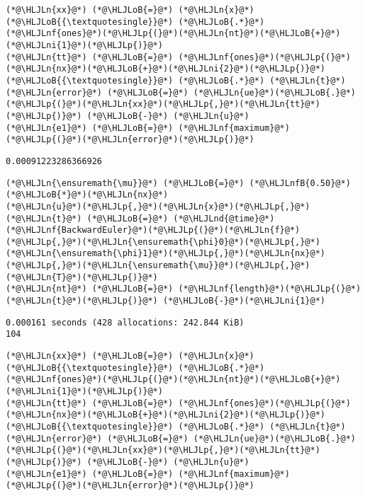 \documentclass[12pt,landscape]{article}
\newcommand{\HLJLn}[1]{#1}
\newcommand{\HLJLnd}[1]{\textcolor[RGB]{214,102,97}{#1}}
\newcommand{\HLJLnf}[1]{\textcolor[RGB]{66,102,213}{#1}}
\newcommand{\HLJLnfB}[1]{\textcolor[RGB]{59,151,46}{#1}}
\newcommand{\HLJLni}[1]{\textcolor[RGB]{59,151,46}{#1}}
\newcommand{\HLJLoB}[1]{\textcolor[RGB]{102,102,102}{\textbf{#1}}}
\newcommand{\HLJLp}[1]{#1}
\begin{document}
{\begin{lstlisting}
(*@\HLJLn{xx}@*) (*@\HLJLoB{=}@*) (*@\HLJLn{x}@*)(*@\HLJLoB{{\textquotesingle}}@*) (*@\HLJLoB{.*}@*) (*@\HLJLnf{ones}@*)(*@\HLJLp{(}@*)(*@\HLJLn{nt}@*)(*@\HLJLoB{+}@*)(*@\HLJLni{1}@*)(*@\HLJLp{)}@*)
(*@\HLJLn{tt}@*) (*@\HLJLoB{=}@*) (*@\HLJLnf{ones}@*)(*@\HLJLp{(}@*)(*@\HLJLn{nx}@*)(*@\HLJLoB{+}@*)(*@\HLJLni{2}@*)(*@\HLJLp{)}@*)(*@\HLJLoB{{\textquotesingle}}@*) (*@\HLJLoB{.*}@*) (*@\HLJLn{t}@*)
(*@\HLJLn{error}@*) (*@\HLJLoB{=}@*) (*@\HLJLn{ue}@*)(*@\HLJLoB{.}@*)(*@\HLJLp{(}@*)(*@\HLJLn{xx}@*)(*@\HLJLp{,}@*)(*@\HLJLn{tt}@*)(*@\HLJLp{)}@*) (*@\HLJLoB{-}@*) (*@\HLJLn{u}@*) 
(*@\HLJLn{e1}@*) (*@\HLJLoB{=}@*) (*@\HLJLnf{maximum}@*)(*@\HLJLp{(}@*)(*@\HLJLn{error}@*)(*@\HLJLp{)}@*)
\end{lstlisting}

\begin{lstlisting}
0.00091223286366926
\end{lstlisting}


\begin{lstlisting}
(*@\HLJLn{\ensuremath{\mu}}@*) (*@\HLJLoB{=}@*) (*@\HLJLnfB{0.50}@*)(*@\HLJLoB{*}@*)(*@\HLJLn{nx}@*)
(*@\HLJLn{u}@*)(*@\HLJLp{,}@*)(*@\HLJLn{x}@*)(*@\HLJLp{,}@*)(*@\HLJLn{t}@*) (*@\HLJLoB{=}@*) (*@\HLJLnd{@time}@*) (*@\HLJLnf{BackwardEuler}@*)(*@\HLJLp{(}@*)(*@\HLJLn{f}@*)(*@\HLJLp{,}@*)(*@\HLJLn{\ensuremath{\phi}0}@*)(*@\HLJLp{,}@*)(*@\HLJLn{\ensuremath{\phi}1}@*)(*@\HLJLp{,}@*)(*@\HLJLn{nx}@*)(*@\HLJLp{,}@*)(*@\HLJLn{\ensuremath{\mu}}@*)(*@\HLJLp{,}@*)(*@\HLJLn{T}@*)(*@\HLJLp{)}@*)
(*@\HLJLn{nt}@*) (*@\HLJLoB{=}@*) (*@\HLJLnf{length}@*)(*@\HLJLp{(}@*)(*@\HLJLn{t}@*)(*@\HLJLp{)}@*) (*@\HLJLoB{-}@*)(*@\HLJLni{1}@*)
\end{lstlisting}

\begin{lstlisting}
0.000161 seconds (428 allocations: 242.844 KiB)
104
\end{lstlisting}


\begin{lstlisting}
(*@\HLJLn{xx}@*) (*@\HLJLoB{=}@*) (*@\HLJLn{x}@*)(*@\HLJLoB{{\textquotesingle}}@*) (*@\HLJLoB{.*}@*) (*@\HLJLnf{ones}@*)(*@\HLJLp{(}@*)(*@\HLJLn{nt}@*)(*@\HLJLoB{+}@*)(*@\HLJLni{1}@*)(*@\HLJLp{)}@*)
(*@\HLJLn{tt}@*) (*@\HLJLoB{=}@*) (*@\HLJLnf{ones}@*)(*@\HLJLp{(}@*)(*@\HLJLn{nx}@*)(*@\HLJLoB{+}@*)(*@\HLJLni{2}@*)(*@\HLJLp{)}@*)(*@\HLJLoB{{\textquotesingle}}@*) (*@\HLJLoB{.*}@*) (*@\HLJLn{t}@*)
(*@\HLJLn{error}@*) (*@\HLJLoB{=}@*) (*@\HLJLn{ue}@*)(*@\HLJLoB{.}@*)(*@\HLJLp{(}@*)(*@\HLJLn{xx}@*)(*@\HLJLp{,}@*)(*@\HLJLn{tt}@*)(*@\HLJLp{)}@*) (*@\HLJLoB{-}@*) (*@\HLJLn{u}@*) 
(*@\HLJLn{e1}@*) (*@\HLJLoB{=}@*) (*@\HLJLnf{maximum}@*)(*@\HLJLp{(}@*)(*@\HLJLn{error}@*)(*@\HLJLp{)}@*)
\end{lstlisting}

}
\end{document}
